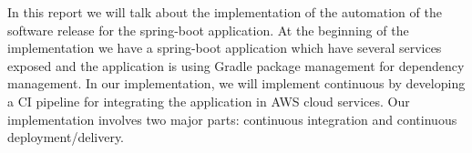 In this report we will talk about the implementation of the automation of the software release for the spring-boot application. At the beginning of the implementation we have a spring-boot application which have several services exposed and the application is using Gradle package management for dependency management. In our implementation, we will implement continuous by developing a CI pipeline for integrating the application in AWS cloud services. Our implementation involves two major parts: continuous integration and continuous deployment/delivery. 







